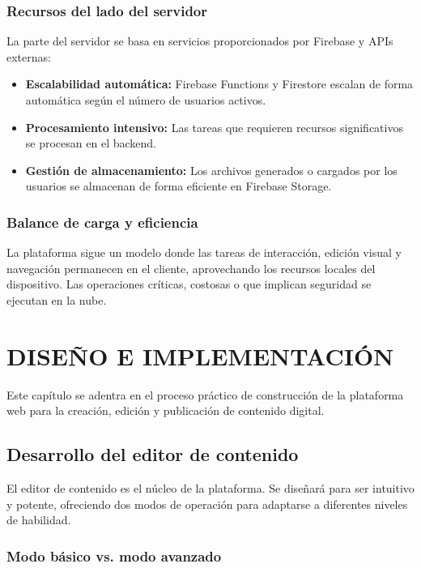 \documentclass[12pt,a4paper]{report}
\begin{document}
\subsection{Recursos del lado del servidor}

La parte del servidor se basa en servicios proporcionados por Firebase y APIs externas:

\begin{itemize}
\item \textbf{Escalabilidad automática:} Firebase Functions y Firestore escalan de forma automática según el número de usuarios activos.

\item \textbf{Procesamiento intensivo:} Las tareas que requieren recursos significativos se procesan en el backend.

\item \textbf{Gestión de almacenamiento:} Los archivos generados o cargados por los usuarios se almacenan de forma eficiente en Firebase Storage.
\end{itemize}

\subsection{Balance de carga y eficiencia}

La plataforma sigue un modelo donde las tareas de interacción, edición visual y navegación permanecen en el cliente, aprovechando los recursos locales del dispositivo. Las operaciones críticas, costosas o que implican seguridad se ejecutan en la nube.

\chapter{DISEÑO E IMPLEMENTACIÓN}

Este capítulo se adentra en el proceso práctico de construcción de la plataforma web para la creación, edición y publicación de contenido digital.

\section{Desarrollo del editor de contenido}

El editor de contenido es el núcleo de la plataforma. Se diseñará para ser intuitivo y potente, ofreciendo dos modos de operación para adaptarse a diferentes niveles de habilidad.

\subsection{Modo básico vs. modo avanzado}
\end{document}
